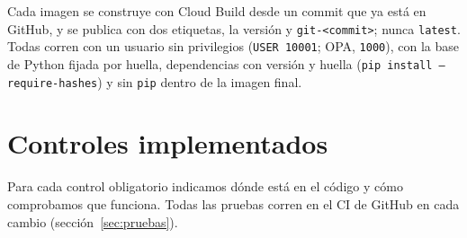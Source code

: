 \documentclass[11pt,letterpaper]{article}
\newcommand{\cod}[1]{\texttt{\small #1}}
\begin{document}
Cada imagen se construye con Cloud Build desde un commit que ya está en GitHub, y se publica con dos
etiquetas, la versión y \cod{git-<commit>}; nunca \cod{latest}. Todas corren con un usuario sin
privilegios (\cod{USER 10001}; OPA, \cod{1000}), con la base de Python fijada por huella, dependencias
con versión y huella (\cod{pip install --require-hashes}) y sin \cod{pip} dentro de la imagen final.

\section{Controles implementados}

Para cada control obligatorio indicamos dónde está en el código y cómo comprobamos que funciona.
Todas las pruebas corren en el CI de GitHub en cada cambio (sección~\ref{sec:pruebas}).
\end{document}
